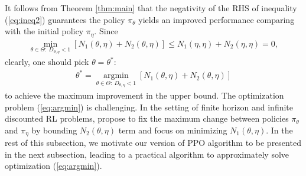 \documentclass[11pt]{article}
\DeclareMathOperator{\argmin}{argmin}
\newcommand{\V}{\mathcal{V}}
\providecommand{\argmin}{\text{argmin}}
\newtheorem{theorem}{Theorem}
\theoremstyle{definition}
\numberwithin{equation}{section}
\begin{document}
%
%
%
%
%
%

It follows from Theorem \ref{thm:main} that the negativity of the RHS of inequality (\ref{eq:ineq2}) guarantees the policy $\pi_\theta$ yields an improved performance comparing with the initial policy $\pi_{\eta}.$
Since
\begin{align*}
 \min\limits_{\theta \in \Theta: ~D_{\theta, \eta}<1}[N_1(\theta, \eta) +N_2(\theta, \eta)] \leq N_1(\eta, \eta) +N_2(\eta, \eta) = 0,
\end{align*}
clearly, one should pick $\theta=\theta^*$:
\begin{align}
  \label{eq:argmin}
  \theta^* =\argmin \limits_{\theta \in \Theta: ~D_{\theta, \eta}<1}[N_1(\theta, \eta) +N_2(\theta, \eta)]
\end{align}
to achieve the maximum improvement in the upper bound.  The
optimization problem (\ref{eq:argmin}) is challenging. In the setting
of finite horizon and infinite discounted RL problems,
\cite{Kakade2002, Schulman2015} propose to fix the maximum change
between policies $\pi_\theta$ and $\pi_{\eta}$ by bounding
$N_2(\theta, \eta)$ term and focus on minimizing $N_1(\theta, \eta)$.
In the rest of this subsection, we motivate our version of PPO algorithm to be
presented in the next subsection,
leading to a practical algorithm to approximately solve optimization
(\ref{eq:argmin}).
\end{document}
